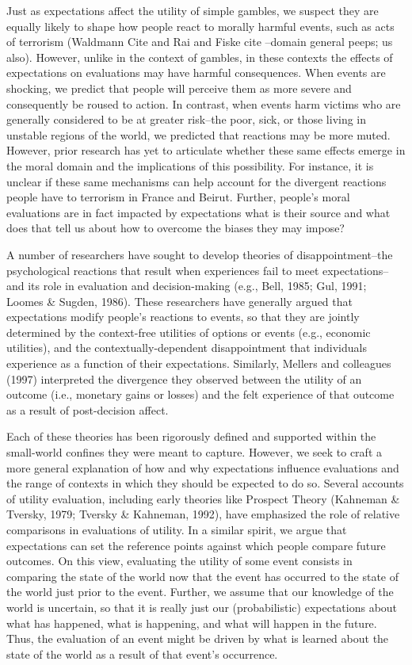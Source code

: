 \documentclass[]{article}
\begin{document}
Just as expectations affect the utility of simple gambles, we suspect
they are equally likely to shape how people react to morally harmful
events, such as acts of terrorism (Waldmann Cite and Rai and Fiske cite
--domain general peeps; us also). However, unlike in the context of
gambles, in these contexts the effects of expectations on evaluations
may have harmful consequences. When events are shocking, we predict that
people will perceive them as more severe and consequently be roused to
action. In contrast, when events harm victims who are generally
considered to be at greater risk--the poor, sick, or those living in
unstable regions of the world, we predicted that reactions may be more
muted. However, prior research has yet to articulate whether these same
effects emerge in the moral domain and the implications of this
possibility. For instance, it is unclear if these same mechanisms can
help account for the divergent reactions people have to terrorism in
France and Beirut. Further, people's moral evaluations are in fact
impacted by expectations what is their source and what does that tell us
about how to overcome the biases they may impose?

A number of researchers have sought to develop theories of
disappointment--the psychological reactions that result when experiences
fail to meet expectations--and its role in evaluation and
decision-making (e.g., Bell, 1985; Gul, 1991; Loomes \& Sugden, 1986).
These researchers have generally argued that expectations modify
people's reactions to events, so that they are jointly determined by the
context-free utilities of options or events (e.g., economic utilities),
and the contextually-dependent disappointment that individuals
experience as a function of their expectations. Similarly, Mellers and
colleagues (1997) interpreted the divergence they observed between the
utility of an outcome (i.e., monetary gains or losses) and the felt
experience of that outcome as a result of post-decision affect.

Each of these theories has been rigorously defined and supported within
the small-world confines they were meant to capture. However, we seek to
craft a more general explanation of how and why expectations influence
evaluations and the range of contexts in which they should be expected
to do so. Several accounts of utility evaluation, including early
theories like Prospect Theory (Kahneman \& Tversky, 1979; Tversky \&
Kahneman, 1992), have emphasized the role of relative comparisons in
evaluations of utility. In a similar spirit, we argue that expectations
can set the reference points against which people compare future
outcomes. On this view, evaluating the utility of some event consists in
comparing the state of the world now that the event has occurred to the
state of the world just prior to the event. Further, we assume that our
knowledge of the world is uncertain, so that it is really just our
(probabilistic) expectations about what has happened, what is happening,
and what will happen in the future. Thus, the evaluation of an event
might be driven by what is learned about the state of the world as a
result of that event's occurrence.
\end{document}
